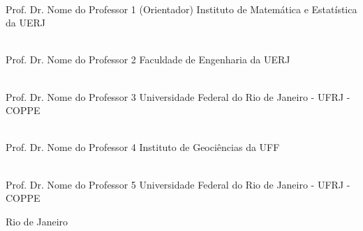 \begin{flushright}
\parbox{12cm}{

\singlespacing

\hrulefill \\

\vspace{-.4cm}
Prof. Dr. Nome do Professor 1 (Orientador)
\newline
Instituto de Matemática e Estatística da UERJ
\vspace{.7cm}

\hrulefill \\

\vspace{-.4cm}
Prof. Dr. Nome do Professor 2
\newline
Faculdade de Engenharia da UERJ
\vspace{.7cm}

\hrulefill \\

\vspace{-.4cm}
Prof. Dr. Nome do Professor 3
\newline
Universidade Federal do Rio de Janeiro - UFRJ - COPPE
\vspace{.7cm}

\hrulefill \\

\vspace{-.4cm}
Prof. Dr. Nome do Professor 4
\newline
Instituto de Geociências da UFF
\vspace{.7cm}

\hrulefill \\

\vspace{-.4cm}
Prof. Dr. Nome do Professor 5
\newline
Universidade Federal do Rio de Janeiro - UFRJ - COPPE
\vspace{.7cm}

}
\end{flushright}
\vfill

\begin{center}
Rio de Janeiro
\end{center}